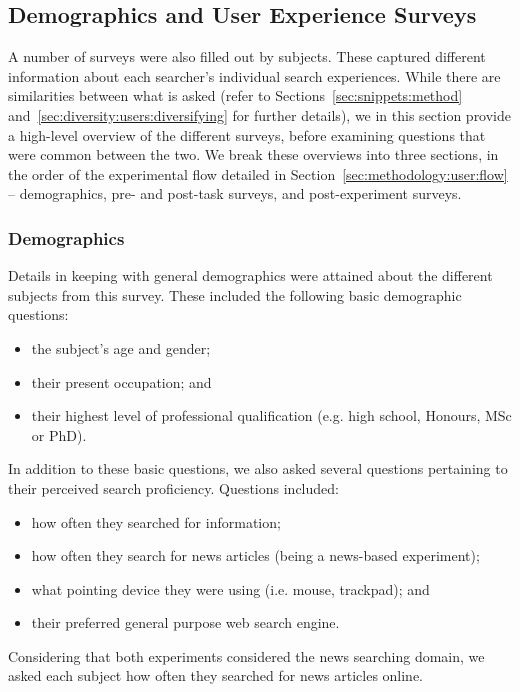 \subsection{Demographics and User Experience Surveys}\label{sec:methodology:extracting:user}
A number of surveys were also filled out by subjects. These captured different information about each searcher's individual search experiences. While there are similarities between what is asked (refer to Sections~\ref{sec:snippets:method} and~\ref{sec:diversity:users:diversifying} for further details), we in this section provide a high-level overview of the different surveys, before examining questions that were common between the two. We break these overviews into three sections, in the order of the experimental flow detailed in Section~\ref{sec:methodology:user:flow} -- demographics, pre- and post-task surveys, and post-experiment surveys.

\subsubsection{Demographics}
Details in keeping with general demographics were attained about the different subjects from this survey. These included the following basic demographic questions:

\begin{itemize}
    \item{the subject's age and gender;}
    \item{their present occupation; and}
    \item{their highest level of professional qualification (e.g. high school, Honours, MSc or PhD).}
\end{itemize}

In addition to these basic questions, we also asked several questions pertaining to their perceived search proficiency. Questions included:

\begin{itemize}
    \item{how often they searched for information;}
    \item{how often they search for news articles (being a news-based experiment);}
    \item{what pointing device they were using (i.e. mouse, trackpad); and}
    \item{their preferred general purpose web search engine.}
\end{itemize}

Considering that both experiments considered the news searching domain, we asked each subject how often they searched for news articles online.

